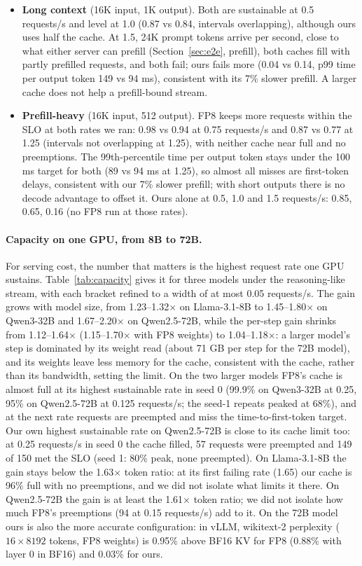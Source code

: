 \documentclass[11pt]{article}
\begin{document}
\begin{itemize}
  \item \textbf{Long context} (16K input, 1K output). Both are sustainable at 0.5 requests/s and level at 1.0 (0.87 vs 0.84, intervals overlapping), although ours uses half the cache. At 1.5, 24K prompt tokens arrive per second, close to what either server can prefill (Section~\ref{sec:e2e}, prefill), both caches fill with partly prefilled requests, and both fail; ours fails more (0.04 vs 0.14, p99 time per output token 149 vs 94 ms), consistent with its 7\% slower prefill. A larger cache does not help a prefill-bound stream.
  \item \textbf{Prefill-heavy} (16K input, 512 output). FP8 keeps more requests within the SLO at both rates we ran: 0.98 vs 0.94 at 0.75 requests/s and 0.87 vs 0.77 at 1.25 (intervals not overlapping at 1.25), with neither cache near full and no preemptions. The 99th-percentile time per output token stays under the 100 ms target for both (89 vs 94 ms at 1.25), so almost all misses are first-token delays, consistent with our 7\% slower prefill; with short outputs there is no decode advantage to offset it. Ours alone at 0.5, 1.0 and 1.5 requests/s: 0.85, 0.65, 0.16 (no FP8 run at those rates).
\end{itemize}

\paragraph{Capacity on one GPU, from 8B to 72B.} For serving cost, the number that matters is the highest request rate one GPU sustains. Table~\ref{tab:capacity} gives it for three models under the reasoning-like stream, with each bracket refined to a width of at most 0.05 requests/s. The gain grows with model size, from 1.23--1.32$\times$ on Llama-3.1-8B to 1.45--1.80$\times$ on Qwen3-32B and 1.67--2.20$\times$ on Qwen2.5-72B, while the per-step gain shrinks from 1.12--1.64$\times$ (1.15--1.70$\times$ with FP8 weights) to 1.04--1.18$\times$: a larger model's step is dominated by its weight read (about 71 GB per step for the 72B model), and its weights leave less memory for the cache, consistent with the cache, rather than its bandwidth, setting the limit. On the two larger models FP8's cache is almost full at its highest sustainable rate in seed 0 (99.9\% on Qwen3-32B at 0.25, 95\% on Qwen2.5-72B at 0.125 requests/s; the seed-1 repeats peaked at 68\%), and at the next rate requests are preempted and miss the time-to-first-token target. Our own highest sustainable rate on Qwen2.5-72B is close to its cache limit too: at 0.25 requests/s in seed 0 the cache filled, 57 requests were preempted and 149 of 150 met the SLO (seed 1: 80\% peak, none preempted). On Llama-3.1-8B the gain stays below the 1.63$\times$ token ratio: at its first failing rate (1.65) our cache is 96\% full with no preemptions, and we did not isolate what limits it there. On Qwen2.5-72B the gain is at least the 1.61$\times$ token ratio; we did not isolate how much FP8's preemptions (94 at 0.15 requests/s) add to it. On the 72B model ours is also the more accurate configuration: in vLLM, wikitext-2 perplexity ($16 \times 8192$ tokens, FP8 weights) is 0.95\% above BF16 KV for FP8 (0.88\% with layer 0 in BF16) and 0.03\% for ours.
\end{document}
